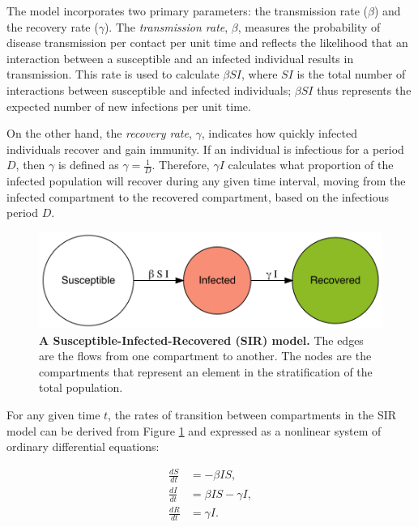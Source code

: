 \documentclass[
11pt, %
oneside, %
english, %
singlespacing, %
]{macthesis} %
\begin{document}
The model incorporates two primary parameters: the transmission rate (\(\beta\)) and the recovery rate (\(\gamma\)). The \emph{transmission rate}, \(\beta\), measures the probability of disease transmission per contact per unit time and reflects the likelihood that an interaction between a susceptible and an infected individual results in transmission. This rate is used to calculate \(\beta SI\), where \(SI\) is the total number of interactions between susceptible and infected individuals; \(\beta SI\) thus represents the expected number of new infections per unit time.

On the other hand, the \emph{recovery rate}, \(\gamma\), indicates how quickly infected individuals recover and gain immunity. If an individual is infectious for a period \(D\), then \(\gamma\) is defined as \(\gamma = \frac{1}{D}\). Therefore, \(\gamma I\) calculates what proportion of the infected population will recover during any given time interval, moving from the infected compartment to the recovered compartment, based on the infectious period \(D\).

\begin{figure}[H]
\centering
\includegraphics[width=\textwidth]{figure/sir_model.png}
\caption[Susceptible-Infected-Recovered (SIR) model]{\textbf{A Susceptible-Infected-Recovered (SIR) model.} The edges are the flows from one compartment to another. The nodes are the compartments that represent an element in the stratification of the total population.}
\label{fig:sir-model}
\end{figure}

For any given time \(t\), the rates of transition between compartments in the SIR model can be derived from Figure \ref{fig:sir-model} and expressed as a nonlinear system of ordinary differential equations:

\begin{equation}
\begin{aligned}
\frac{dS}{dt} &= -\beta IS, \\
\frac{dI}{dt} &= \beta IS - \gamma I, \\
\frac{dR}{dt} &= \gamma I.
\end{aligned}
\label{eq:sir ode}
\end{equation}
\end{document}
